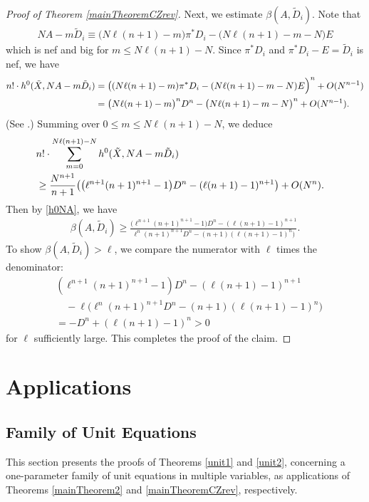 \documentclass[10pt]{amsart}
\numberwithin{equation}{section}
\theoremstyle{plain}
\theoremstyle{definition}
\begin{document}
\begin{proof}[Proof of Theorem \ref{mainTheoremCZrev}]
 Next, we estimate $\beta(A,\tilde D_i)$.  Note that 
\begin{align}\label{NAD}
 NA-m\tilde D_i \equiv  \big(N\ell (n+1)-m)\pi^*D_i-\big( N\ell (n+1)-m-N\big)E  
\end{align}
 which is nef and big for $m\le N\ell (n+1)-N$.   Since $\pi^*D_i$ and  $\pi^*D_i-E=\tilde D_i$ is nef, we have 
\begin{align*}
 n!\cdot  h^0(\tilde X,NA-m\tilde D_i)
 &=  \big(\large(N\ell (n+1)-m\large)\pi^*D_i-\large( N\ell (n+1)-m-N\large)E \big)^n+O(N^{n-1})\\
 &= \big( N\ell (n+1)- m\big)^nD^n-\big( N\ell (n+1)- m-N \big)^n+O(N^{n-1}).
\end{align*}
(See \cite[p.~233, Case $k\le n$]{Aut09}.)
Summing over $0\le m\le N\ell (n+1)-N$, we deduce
\begin{align*}
&n!\cdot \sum_{m=0}^{N\ell (n+1)-N} h^0(\tilde X,NA-m\tilde D_i) \cr
&\ge  \frac{N^{n+1}}{n+1}\big(\big(\ell^{n+1}(n+1)^{n+1}-1\big) D^n- (\ell (n+1)-1)^{n+1}\big)+O(N^{n}).
\end{align*}
Then by \eqref{h0NA}, we have
 \begin{align*}
\beta(A,\tilde D_i)\ge \frac{ \big(\ell^{n+1}(n+1)^{n+1}-1\big) D^n- (\ell (n+1)-1)^{n+1} }{ \ell^n (n+1)^{n+1} D^n- (n+1)(\ell (n+1)-1)^n\big)}.
\end{align*}
To show $\beta(A,\tilde D_i)>\ell$, we compare the numerator with $\ell$ times the denominator:
\begin{align*}
&(\ell^{n+1}(n+1)^{n+1}-1)D^n - (\ell(n+1)-1)^{n+1} \\
&\quad - \ell\Big(\ell^n (n+1)^{n+1}D^n - (n+1)(\ell(n+1)-1)^n\Big) \\
&= -D^n + (\ell(n+1)-1)^n > 0
\end{align*}
for $\ell$  sufficiently large. This completes the proof of the claim.
\end{proof}

 




\section{Applications}\label{Application}
  
\subsection{Family of Unit Equations}
This section presents the proofs of Theorems \ref{unit1} and \ref{unit2}, concerning a one-parameter family of unit equations in multiple variables, as applications of Theorems \ref{mainTheorem2} and \ref{mainTheoremCZrev}, respectively.
\end{document}

